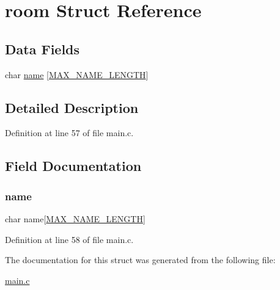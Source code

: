 \hypertarget{structroom}{}\section{room Struct Reference}
\label{structroom}
\subsection*{Data Fields}
\begin{DoxyCompactItemize}
\item 
char \hyperlink{structroom_ad50982abf9e9bbbc784f8f17fa25b1b2}{name} \mbox{[}\hyperlink{main_8c_a0c397a708cec89c74029582574516b30}{M\+A\+X\+\_\+\+N\+A\+M\+E\+\_\+\+L\+E\+N\+G\+TH}\mbox{]}
\end{DoxyCompactItemize}


\subsection{Detailed Description}


Definition at line 57 of file main.\+c.



\subsection{Field Documentation}
\hypertarget{structroom_ad50982abf9e9bbbc784f8f17fa25b1b2}{}\label{structroom_ad50982abf9e9bbbc784f8f17fa25b1b2} 
\subsubsection{\texorpdfstring{name}{name}}
{\footnotesize\ttfamily char name\mbox{[}\hyperlink{main_8c_a0c397a708cec89c74029582574516b30}{M\+A\+X\+\_\+\+N\+A\+M\+E\+\_\+\+L\+E\+N\+G\+TH}\mbox{]}}



Definition at line 58 of file main.\+c.



The documentation for this struct was generated from the following file\+:\begin{DoxyCompactItemize}
\item 
\hyperlink{main_8c}{main.\+c}\end{DoxyCompactItemize}
